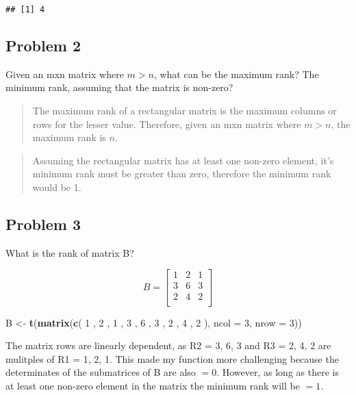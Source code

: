 \documentclass[]{article}
\newenvironment{Shaded}{\begin{snugshade}}{\end{snugshade}}
\newcommand{\KeywordTok}[1]{\textcolor[rgb]{0.13,0.29,0.53}{\textbf{{#1}}}}
\newcommand{\DataTypeTok}[1]{\textcolor[rgb]{0.13,0.29,0.53}{{#1}}}
\newcommand{\DecValTok}[1]{\textcolor[rgb]{0.00,0.00,0.81}{{#1}}}
\newcommand{\StringTok}[1]{\textcolor[rgb]{0.31,0.60,0.02}{{#1}}}
\newcommand{\NormalTok}[1]{{#1}}
\begin{document}
\begin{verbatim}
## [1] 4
\end{verbatim}

\subsection{Problem 2}\label{problem-2}

Given an mxn matrix where \(m > n\), what can be the maximum rank? The
minimum rank, assuming that the matrix is non-zero?

\begin{quote}
The maximum rank of a rectangular matrix is the maximum columns or rows
for the lesser value. Therefore, given an mxn matrix where \(m > n\),
the maximum rank is \(n\).
\end{quote}

\begin{quote}
Assuming the rectangular matrix has at least one non-zero element, it's
minimum rank must be greater than zero, therefore the minimum rank would
be 1.
\end{quote}

\subsection{Problem 3}\label{problem-3}

What is the rank of matrix B?

\[
B = 
\begin{bmatrix}
   1 & 2 & 1 \\
   3 & 6 & 3 \\
   2 & 4 & 2 \\
\end{bmatrix}
\]

\begin{Shaded}
\begin{Highlighting}[]
\NormalTok{B <-}\StringTok{ }\KeywordTok{t}\NormalTok{(}\KeywordTok{matrix}\NormalTok{(}\KeywordTok{c}\NormalTok{( }\DecValTok{1} \NormalTok{, }\DecValTok{2} \NormalTok{, }\DecValTok{1} \NormalTok{,  }\DecValTok{3} \NormalTok{,  }\DecValTok{6} \NormalTok{, }\DecValTok{3} \NormalTok{,  }\DecValTok{2} \NormalTok{,  }\DecValTok{4} \NormalTok{, }\DecValTok{2} \NormalTok{), }\DataTypeTok{ncol =} \DecValTok{3}\NormalTok{, }\DataTypeTok{nrow =} \DecValTok{3}\NormalTok{))}
\end{Highlighting}
\end{Shaded}

The matrix rows are linearly dependent, as R2 = 3, 6, 3 and R3 = 2, 4, 2
are mulitples of R1 = 1, 2, 1. This made my function more challenging
because the determinates of the submatrices of B are also \(= 0\).
However, as long as there is at least one non-zero element in the matrix
the minimum rank will be \(= 1\).
\end{document}

